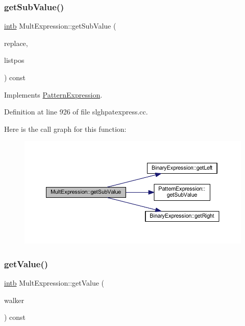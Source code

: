 \subsubsection{\texorpdfstring{getSubValue()}{getSubValue()}}
{\footnotesize\ttfamily \mbox{\hyperlink{types_8h_aa925ba3e627c2df89d5b1cfe84fb8572}{intb}} Mult\+Expression\+::get\+Sub\+Value (\begin{DoxyParamCaption}\item[{const vector$<$ \mbox{\hyperlink{types_8h_aa925ba3e627c2df89d5b1cfe84fb8572}{intb}} $>$ \&}]{replace,  }\item[{int4 \&}]{listpos }\end{DoxyParamCaption}) const\hspace{0.3cm}{\ttfamily [virtual]}}



Implements \mbox{\hyperlink{class_pattern_expression_ade37db4aa76dd442b189bf4a6bb2d9dd}{Pattern\+Expression}}.



Definition at line 926 of file slghpatexpress.\+cc.

Here is the call graph for this function\+:
\nopagebreak
\begin{figure}[H]
\begin{center}
\leavevmode
\includegraphics[width=350pt]{class_mult_expression_ae435f0944f0ee57367618a778e341735_cgraph}
\end{center}
\end{figure}
\mbox{\label{class_mult_expression_a82c37f1e8c8b88955946f416619a861e}} 
\subsubsection{\texorpdfstring{getValue()}{getValue()}}
{\footnotesize\ttfamily \mbox{\hyperlink{types_8h_aa925ba3e627c2df89d5b1cfe84fb8572}{intb}} Mult\+Expression\+::get\+Value (\begin{DoxyParamCaption}\item[{\mbox{\hyperlink{class_parser_walker}{Parser\+Walker}} \&}]{walker }\end{DoxyParamCaption}) const\hspace{0.3cm}{\ttfamily [virtual]}}




